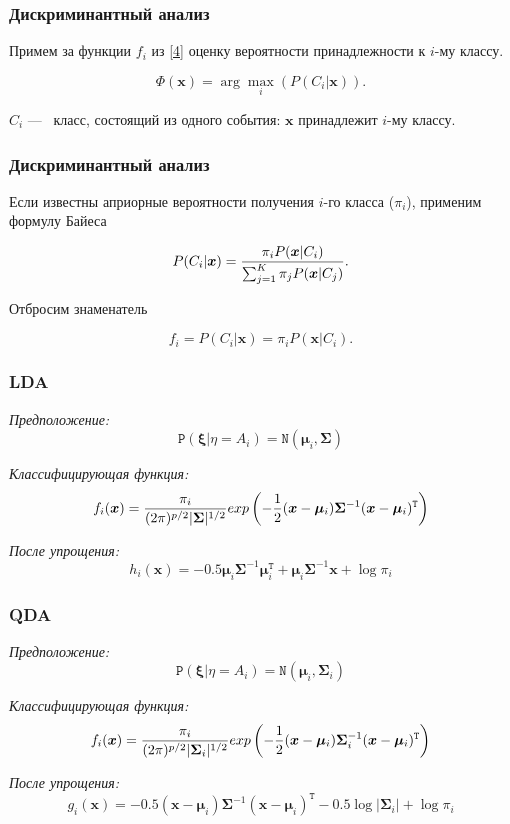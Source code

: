 \documentclass[11pt]{beamer}
\begin{document}
	\begin{frame}
		\frametitle{Дискриминантный анализ}
		Примем за функции $f_i$ из \ref{4} оценку вероятности принадлежности к $i$-му классу.
		
		$$\Phi(\bm{x}) = \arg\max_i (P(C_i|\bm{x})).$$
		
		$C_i$ ---  класс, состоящий из одного события: $\bm{x}$ принадлежит $i$-му классу.
	\end{frame}
	\begin{frame}
		\frametitle{Дискриминантный анализ}
		Если известны априорные вероятности получения $i$-го класса ($\pi_i$), применим формулу Байеса
		
		$$P(C_i|\bm{x}) = {{\pi_i P(\bm{x}|C_i)}\over{\sum_{j=1}^{K} \pi_j P(\bm{x}|C_j)}}.$$
		 
		 Отбросим знаменатель
		
		$$f_i = P(C_i|\bm{x}) = \pi_i P(\bm{x}|C_i).$$
	\end{frame}
	\begin{frame}
		\frametitle{LDA}
		\textit{Предположение:}	
		$$\mathtt{P}(\bm{\xi}|\eta = A_i) = \mathtt{N}(\bm{\mu}_i, \bm{\Sigma})$$
		
		\textit{Классифицирующая функция:}
		$$f_i(\bm{x}) = {{\pi_i}\over{(2\pi)^{p/2}|\bm{\Sigma}|^{1/2}}}exp\left(-{{1}\over{2}}(\bm{x} - \bm{\mu}_i)\bm{\Sigma}^{-1}(\bm{x} - \bm{\mu}_i)^\mathtt{T}\right)$$
		
		\textit{После упрощения:}
		$$h_i(\bm{x}) = -0.5 \bm{\mu}_i\bm{\Sigma}^{-1}\bm{\mu}_i^\mathtt{T} + \bm{\mu}_i\bm{\Sigma}^{-1}\bm{x} + \log\pi_i$$

	\end{frame}

	\begin{frame}
		\frametitle{QDA}
		\textit{Предположение:}	
		$$\mathtt{P}(\bm{\xi}|\eta = A_i) = \mathtt{N}(\bm{\mu}_i, \bm{\Sigma}_i)$$
		
		\textit{Классифицирующая функция:}
		$$f_i(\bm{x}) = {{\pi_i}\over{(2\pi)^{p/2}|\bm{\Sigma}_i|^{1/2}}}exp\left(-{{1}\over{2}}(\bm{x} - \bm{\mu}_i)\bm{\Sigma}_i^{-1}(\bm{x} - \bm{\mu}_i)^\mathtt{T}\right)$$
		
		\textit{После упрощения:}
		$$g_i(\bm{x}) = -0.5 (\bm{x} - \bm{\mu}_i)\bm{\Sigma}^{-1}(\bm{x} - \bm{\mu}_i)^\mathtt{T} - 0.5\log|\bm{\Sigma}_i| + \log\pi_i$$
		
	\end{frame}
\end{document}
